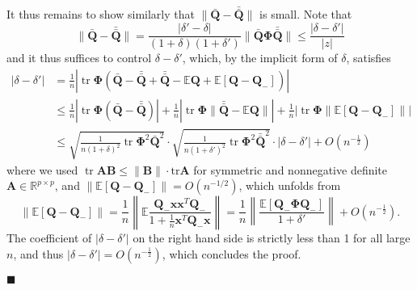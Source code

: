 \documentclass[12pt]{article}
\DeclareMathOperator{\tr}{tr}
\begin{document}
It thus remains to show similarly that $\|\bar{\mathbf{Q}} - \bar{\bar{\mathbf{Q}}}\|$ is small. Note that
\begin{equation*}
\|\bar{\mathbf{Q}} - \bar{\bar{\mathbf{Q}}}\| = \frac{|\delta' - \delta|}{(1 + \delta)(1 + \delta')} \|\bar{\mathbf{Q}}\boldsymbol{\Phi}\bar{\bar{\mathbf{Q}}}\| \leq \frac{|\delta - \delta'|}{|z|}
\end{equation*}
and it thus suffices to control $\delta - \delta'$, which, by the implicit form of $\delta$, satisfies
\begin{align*}
|\delta - \delta'| &= \frac{1}{n}\left|\tr\boldsymbol{\Phi}(\bar{\mathbf{Q}} - \bar{\bar{\mathbf{Q}}} + \bar{\bar{\mathbf{Q}}} - \mathbb{E}\mathbf{Q} + \mathbb{E}[\mathbf{Q} - \mathbf{Q}_-])\right|\\
&\leq \frac{1}{n}\left|\tr\boldsymbol{\Phi}(\bar{\mathbf{Q}} - \bar{\bar{\mathbf{Q}}})\right| + \frac{1}{n}\left|\tr\boldsymbol{\Phi}\|\bar{\bar{\mathbf{Q}}} - \mathbb{E}\mathbf{Q}\|\right| + \frac{1}{n}\left|\tr\boldsymbol{\Phi}\|\mathbb{E}[\mathbf{Q} - \mathbf{Q}_-]\|\right|\\
&\leq \sqrt{\frac{1}{n(1 + \delta)^2}\tr\boldsymbol{\Phi}^2\bar{\mathbf{Q}}^2} \cdot \sqrt{\frac{1}{n(1 + \delta')^2}\tr\boldsymbol{\Phi}^2\bar{\bar{\mathbf{Q}}}^2} \cdot |\delta - \delta'| + O(n^{-\frac{1}{2}})
\end{align*}
where we used $\tr\mathbf{A}\mathbf{B} \leq \|\mathbf{B}\| \cdot \text{tr}\mathbf{A}$ for symmetric and nonnegative definite $\mathbf{A} \in \mathbb{R}^{p \times p}$, and $\|\mathbb{E}[\mathbf{Q} - \mathbf{Q}_-]\| = O(n^{-1/2})$, which unfolds from
\begin{equation*}
\|\mathbb{E}[\mathbf{Q} - \mathbf{Q}_-]\| = \frac{1}{n}\left\|\mathbb{E}\frac{\mathbf{Q}_-\mathbf{x}\mathbf{x}^T\mathbf{Q}_-}{1 + \frac{1}{n}\mathbf{x}^T\mathbf{Q}_-\mathbf{x}}\right\| = \frac{1}{n}\left\|\frac{\mathbb{E}[\mathbf{Q}_-\boldsymbol{\Phi}\mathbf{Q}_-]}{1 + \delta'}\right\| + O(n^{-\frac{1}{2}}).
\end{equation*}
The coefficient of $|\delta - \delta'|$ on the right hand side is strictly less than 1 for all large $n$, and thus $|\delta - \delta'| = O(n^{-\frac{1}{2}})$, which concludes the proof.
\begin{flushright}
$\blacksquare$
\end{flushright}



\end{document}
